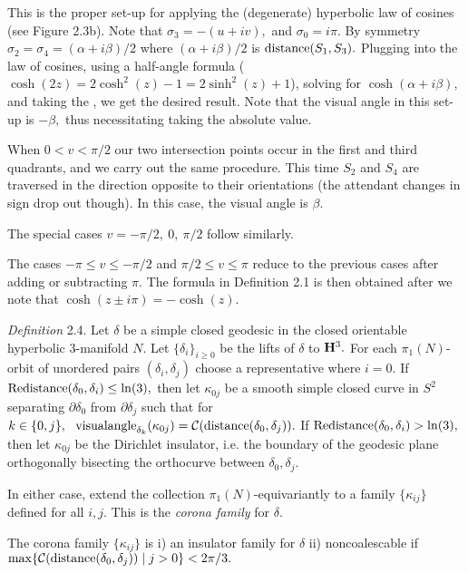 This is the proper set-up for applying the (degenerate) hyperbolic law of
cosines (see Figure 2.3b).  Note that $\sigma_3 = -(u+iv),$ and $\sigma_0 =
i \pi.$ By symmetry $\sigma_2 = \sigma_4 = (\alpha + i \beta)/2$ where
$(\alpha + i \beta)/2$ is ${\rm distance}(S_1, S_3).$  Plugging into the law of
cosines, using a half-angle formula ($\cosh(2z) = 2 \cosh^2(z) - 1 = 2
\sinh^2(z) + 1$), solving for $\cosh(\alpha + i \beta),$ and taking the
\Arccosh, we get the desired result.  Note that the visual angle in this
set-up is $-\beta,$ thus necessitating taking the absolute value.




When $0 < v < \pi/2$ our two intersection points occur in the first and third
quadrants, and we carry out the same procedure.  This
time $S_2$ and $S_4$ are traversed in the direction opposite to their
orientations (the attendant changes in sign drop out though). In this case,
the visual angle is $\beta.$

The special cases $v = -\pi/2,\ 0,\ \pi/2$ follow similarly.

The cases $-\pi \le v \le -\pi/2$ and $\pi/2 \le v \le \pi$ reduce to the
previous cases after adding or subtracting $\pi.$  The formula in
Definition 2.1 is then obtained after we note that $\cosh(z \pm i\pi) = -
\cosh(z)$. \enddemo

{\it Definition} 2.4.  Let $\delta$ be a simple closed
geodesic in the closed
orientable hyperbolic 3-manifold $N.$  Let $\{\delta_i\}_{i\ge 0}$ be the
lifts of
$\delta$ to ${\bf H}^3.$  For each $\pi_1(N)$-orbit of unordered pairs
$(\delta_i,
\delta_j)$ choose a representative where $i=0.$
If\break ${\rm Redistance}(\delta_0, \delta_i)\le \ln(3),$ then let
$\kappa_{0j}$ be a smooth simple closed
curve in $S^2$ separating $\partial \delta_0$ from $\partial \delta_j$ such
that for
$k\in \{0,j\},\ \  \va_{\delta_k}(\kappa_{0j})={\cal C}
(\distance(\delta_0, \delta_j)).$
 If
${\rm Redistance}(\delta_0,\delta_i) > \ln(3),$ then let $\kappa_{0j}$ be the
Dirichlet
insulator, i.e. the boundary of the geodesic plane orthogonally bisecting
the orthocurve between $\delta_0, \delta_j.$

In either case, extend the collection $\pi_1(N)$-equivariantly to a family
$\{\kappa_{ij}\}$ defined for all
$i,j.$  This is the {\it corona family} for $\delta.$

 The corona family $\{\kappa_{ij}\}$ is
{\rm i)}  an insulator family for $\delta$
{\rm ii)}  noncoalescable if $\max\{{\cal C}({\rm distance} (\delta_0, \delta_j))\mid
j>0\}<2\pi/3.$
\endproclaim

